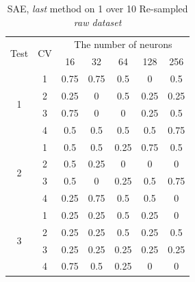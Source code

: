 \documentclass[draft,dvipsnames]{drexel-thesis}
\begin{document}
\begin{thesis}
\begin{table}[!t]
\centering
\caption{SAE, {\em last} method on 1 over 10 Re-sampled {\em raw dataset}}
\label{tbl:sae_last_1_10}
\begin{tabular}{|c|c|c|c|c|c|c|}
\hline
\multirow{2}{*}{Test} & \multirow{2}{*}{CV} & \multicolumn{5}{c|}{The number of neurons}                               \\ \cline{3-7}
                      &                     & 16           & 32           & 64           & 128          & 256          \\ \hline
\multirow{4}{*}{1}    & 1                   & 0.75         & 0.75         & 0.5          & 0            & 0.5          \\ \cline{2-7}
                      & 2                   & 0.25         & 0            & 0.5          & 0.25         & 0.25         \\ \cline{2-7}
                      & 3                   & 0.75         & 0            & 0            & 0.25         & 0.5          \\ \cline{2-7}
                      & 4                   & 0.5          & 0.5          & 0.5          & 0.5          & 0.75         \\ \hline
\multirow{4}{*}{2}    & 1                   & 0.5          & 0.5          & 0.25         & 0.75         & 0.5          \\ \cline{2-7}
                      & 2                   & 0.5          & 0.25         & 0            & 0            & 0            \\ \cline{2-7}
                      & 3                   & 0.5          & 0            & 0.25         & 0.5          & 0.75         \\ \cline{2-7}
                      & 4                   & 0.25         & 0.75         & 0.5          & 0.5          & 0            \\ \hline
\multirow{4}{*}{3}    & 1                   & 0.25         & 0.25         & 0.5          & 0.25         & 0            \\ \cline{2-7}
                      & 2                   & 0.25         & 0.25         & 0.5          & 0.25         & 0.5          \\ \cline{2-7}
                      & 3                   & 0.25         & 0.25         & 0.25         & 0.25         & 0.25         \\ \cline{2-7}
                      & 4                   & 0.75         & 0.5          & 0.25         & 0            & 0            \\ \hline

\end{tabular}
\end{table}
\end{thesis}
\end{document}
